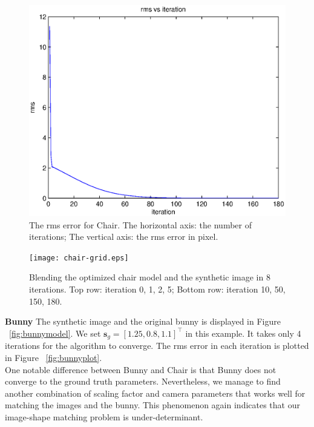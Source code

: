 \documentclass[10pt,twocolumn,letterpaper]{article}
\begin{document}
\begin{figure}[t]
\begin{center}
	\includegraphics[scale=0.55]{chair-figure.eps}
\end{center}
	\caption{The rms error for Chair. The horizontal axis: the number of iterations; The vertical axis: the rms error in pixel.}
\label{fig:chairplot}
\end{figure}

\begin{figure}
\begin{center}
	\texttt{[image: chair-grid.eps]}
\end{center}
   \caption{Blending the optimized chair model and the synthetic image in 8 iterations. Top row: iteration 0, 1, 2, 5; Bottom row: iteration 10, 50, 150, 180.}
\label{fig:chairgrid}
\end{figure}

\noindent
\textbf{Bunny} The synthetic image and the original bunny is displayed in Figure ~\ref{fig:bunnymodel}. We set $\mathbf{s}_g=[1.25, 0.8, 1.1]^\top$ in this example. It takes only 4 iterations for the algorithm to converge. The rms error in each iteration is plotted in Figure ~\ref{fig:bunnyplot}.\\

\noindent
One notable difference between Bunny and Chair is that Bunny does not converge to the ground truth parameters. Nevertheless, we manage to find another combination of scaling factor and camera parameters that works well for matching the images and the bunny. This phenomenon again indicates that our image-shape matching problem is under-determinant.
\end{document}
